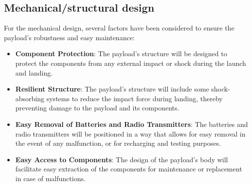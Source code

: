 \subsection{Mechanical/structural design}

For the mechanical design, several factors have been considered to ensure the payload's robustness and easy maintenance:

\begin{itemize}[leftmargin=1.75cm,itemindent=0cm, noitemsep, topsep=3pt,  label=\faCheck]
    \item \textbf{Component Protection}: The payload's structure will be designed to protect the components from any external impact or shock during the launch and landing.
    \item \textbf{Resilient Structure}: The payload's structure will include some shock-absorbing systems to reduce the impact force during landing, thereby preventing damage to the payload and its components.
    \item \textbf{Easy Removal of Batteries and Radio Transmitters}: The batteries and radio transmitters will be positioned in a way that allows for easy removal in the event of any malfunction, or for recharging and testing purposes.
    \item \textbf{Easy Access to Components}: The design of the payload's body will facilitate easy extraction of the components for maintenance or replacement in case of malfunctions.
\end{itemize}


